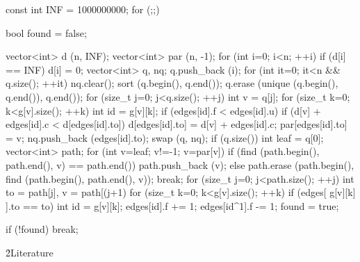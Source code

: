 \code
const int INF = 1000000000;
for (;;) {
bool found = false;

vector<int> d (n, INF);
vector<int> par (n, -1);
for (int i=0; i<n; ++i)
if (d[i] == INF) {
d[i] = 0;
vector<int> q, nq;
q.push_back (i);
for (int it=0; it<n && q.size(); ++it) {
nq.clear();
sort (q.begin(), q.end());
q.erase (unique (q.begin(), q.end()), q.end());
for (size_t j=0; j<q.size(); ++j) {
int v = q[j];
for (size_t k=0; k<g[v].size(); ++k) {
int id = g[v][k];
if (edges[id].f < edges[id].u)
if (d[v] + edges[id].c < d[edges[id].to]) {
d[edges[id].to] = d[v] + edges[id].c;
par[edges[id].to] = v;
nq.push_back (edges[id].to);
}
}
}
swap (q, nq);
}
if (q.size()) {
int leaf = q[0];
vector<int> path;
for (int v=leaf; v!=-1; v=par[v])
if (find (path.begin(), path.end(), v) == path.end())
path.push_back (v);
else {
path.erase (path.begin(), find (path.begin(), path.end(), v));
break;
}
for (size_t j=0; j<path.size(); ++j) {
int to = path[j], v = path[(j+1)%
for (size_t k=0; k<g[v].size(); ++k)
if (edges[ g[v][k] ].to == to) {
int id = g[v][k];
edges[id].f += 1;
edges[id^1].f -= 1;
}
}
found = true;
}
}

if (!found) break;
}
\endcode

\h2{Literature}

\ul{
\li {}
\li {}
\li {}
}